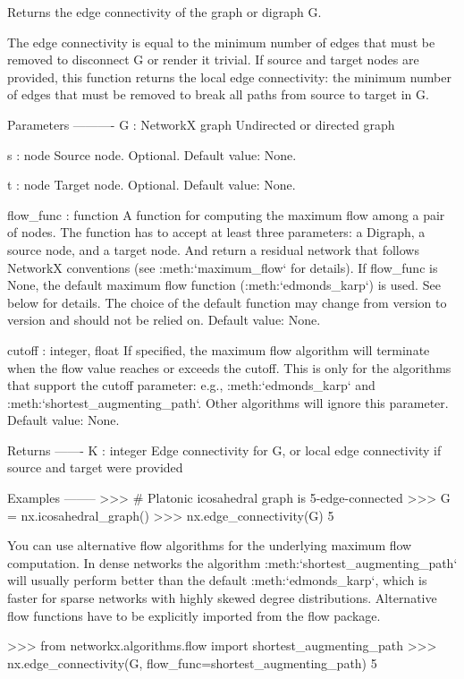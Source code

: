 \begin{DoxyVerb}Returns the edge connectivity of the graph or digraph G.

The edge connectivity is equal to the minimum number of edges that
must be removed to disconnect G or render it trivial. If source
and target nodes are provided, this function returns the local edge
connectivity: the minimum number of edges that must be removed to
break all paths from source to target in G.

Parameters
----------
G : NetworkX graph
    Undirected or directed graph

s : node
    Source node. Optional. Default value: None.

t : node
    Target node. Optional. Default value: None.

flow_func : function
    A function for computing the maximum flow among a pair of nodes.
    The function has to accept at least three parameters: a Digraph,
    a source node, and a target node. And return a residual network
    that follows NetworkX conventions (see :meth:`maximum_flow` for
    details). If flow_func is None, the default maximum flow function
    (:meth:`edmonds_karp`) is used. See below for details. The
    choice of the default function may change from version
    to version and should not be relied on. Default value: None.

cutoff : integer, float
    If specified, the maximum flow algorithm will terminate when the
    flow value reaches or exceeds the cutoff. This is only for the
    algorithms that support the cutoff parameter: e.g., :meth:`edmonds_karp`
    and :meth:`shortest_augmenting_path`. Other algorithms will ignore
    this parameter. Default value: None.

Returns
-------
K : integer
    Edge connectivity for G, or local edge connectivity if source
    and target were provided

Examples
--------
>>> # Platonic icosahedral graph is 5-edge-connected
>>> G = nx.icosahedral_graph()
>>> nx.edge_connectivity(G)
5

You can use alternative flow algorithms for the underlying
maximum flow computation. In dense networks the algorithm
:meth:`shortest_augmenting_path` will usually perform better
than the default :meth:`edmonds_karp`, which is faster for
sparse networks with highly skewed degree distributions.
Alternative flow functions have to be explicitly imported
from the flow package.

>>> from networkx.algorithms.flow import shortest_augmenting_path
>>> nx.edge_connectivity(G, flow_func=shortest_augmenting_path)
5


\end{DoxyVerb}
